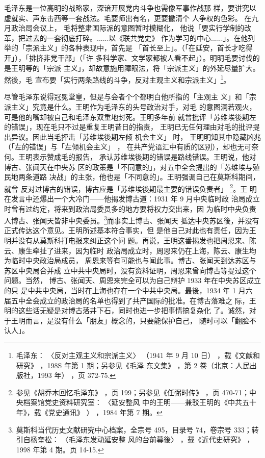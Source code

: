 毛泽东是一位高明的战略家，深谙开展党内斗争也需像军事作战那
样，要讲究以虚就实、声东击西等一套战法。毛要师出有名，更要撇清个
人争权的色彩。
在九月政治局会议上，
毛将整肃国际派的意图暂时模糊化，
他说「要实行学制的改革，把过去的一套彻底打碎。......以《联共党史》
作为学习的中心......」。在他列举的「宗派主义」的各种表现中，首先是
「首长至上」。（「在延安，首长才吃得开」），「排挤非党干部」（「许
多科学家、文学家都被人看不起」）。明明毛要讨伐的是王明等的「宗派
主义」，却故意施用障眼法，将「宗派主义」的外延尽量扩大。然後，毛
宣布要「实行两条路线的斗争，反对主观主义和宗派主义」\footnote{毛泽东：
〈反对主观主义和宗派主义〉
（1941 年 9 月 10 日）
，载《文献和研究》
，198S 年第 1 期；另参见《毛泽
东文集》
，第 2 卷（北京：人民出版社，1993 年）
，页 372-75.}。

尽管毛泽东说得冠冕堂皇，但是与会者个个都明白他所指的「主观主
义」和「宗派主义」究竟是什么。王明作为毛泽东的头号政治对手，对毛
的意图洞若观火，可是他的嘴却被自己和毛泽东双重地封死。王明多年前
就曾批评「苏维埃後期左的错误」，现在毛只不过是重复王明昔日的指责，
王明已无任何理由对毛的批评提出异议。因此当毛抨击「苏维埃後期左倾
机会主义」
时，
王明明知其中隐藏凶兆 （「左的错误」与「左倾机会主义」
，
在共产党语汇中有质的区别），却也无可奈何。王明表示赞成毛的报告，
承认苏维埃後期的错误是路线错误。王明说，他对博古、张闻天在中央苏
区的政策是「不同意的」，对五中全会提出的「苏维埃与殖民地两条道路
决战」的主张，他也是「不同意的」。王明强调自己在莫斯科期间，就曾
反对过博古的错误，博古应是「苏维埃後期最主要的错误负责者」
\footnote{参见《胡乔木回忆毛泽东》
，页 199；另参见《任弼时传》
，页 470-71；中央档案馆党史资料研究室：
〈延安整风
中的王明——兼驳王明的《中共五十年》，载《党史通讯》
〉
，1984 年第 7 期。
}。王
明在发言中还爆出一个大冷门——他揭发博古道：1931 年 9 月中央临时政
治局成立时曾有过约定，将来到政治局委员多的地方要将权力交出来，因
为临时中央负责人博古、张闻天皆非中央委员。\footnote{莫斯科当代历史文献研究中心档案，全宗号 495，目录号 74，卷宗号 333；转引自杨奎松：
〈毛泽东发动延安整
风的台前幕後〉
，载《近代史研究》
，1998 年第 4 期。页 14-15.}而事实上博古、张闻天
抵达中央苏区後，并没有正式传达这个意见。王明所述基本符合事实，但
是他自己对此也有责任，因为王明并没有从莫斯科打电报来纠正这个问
题。再说，王明这番揭发也把周恩来、陈云、康生牵扯了进来，因为临时
政治局成立时，周恩来仍在上海，陈云、康生均为临时中央政治局成员，
周恩来等有可能也与闻此事。博古、张闻天到达苏区与苏区中央局合并成
立中共中央局时，没有资料证明，周恩来曾向博古等提过这个问题。当然，
博古、张闻天、周恩来完全可以为自己辩护 1933 年在中央苏区成立的只
是中共中央局，当时在上海也存在一个中共中央局。最後，1934 年 1 月六
届五中全会成立的政治局的名单也得到了共产国际的批准。在博古落难之
际，王明的这些话无疑是对博古落井下石，同时也进一步把事情搞复杂化
了。诚然，对于王明而言，是没有什么「朋友」概念的，只要能保护自己，
随时可以「翻脸不认人」。


